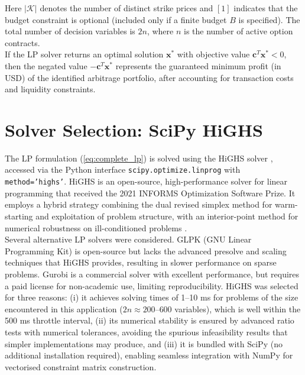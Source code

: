 \documentclass[openany]{book}
\numberwithin{figure}{chapter}
\numberwithin{equation}{chapter}
\begin{document}
Here $|\mathcal{K}|$ denotes the number of distinct strike prices and $[1]$ indicates that the budget constraint is optional (included only if a finite budget $B$ is specified). The total number of decision variables is $2n$, where $n$ is the number of active option contracts.\\

If the LP solver returns an optimal solution $\mathbf{x}^*$ with objective value $\mathbf{c}^T\mathbf{x}^* < 0$, then the negated value $-\mathbf{c}^T\mathbf{x}^*$ represents the guaranteed minimum profit (in USD) of the identified arbitrage portfolio, after accounting for transaction costs and liquidity constraints.

\section{Solver Selection: SciPy HiGHS}

The LP formulation (\ref{eq:complete_lp}) is solved using the HiGHS solver \cite{huangfu2018}, accessed via the Python interface \texttt{scipy.optimize.linprog} with \texttt{method='highs'}. HiGHS is an open-source, high-performance solver for linear programming that received the 2021 INFORMS Optimization Software Prize. It employs a hybrid strategy combining the dual revised simplex method for warm-starting and exploitation of problem structure, with an interior-point method for numerical robustness on ill-conditioned problems \cite{huangfu2018}.\\

Several alternative LP solvers were considered. GLPK (GNU Linear Programming Kit) is open-source but lacks the advanced presolve and scaling techniques that HiGHS provides, resulting in slower performance on sparse problems. Gurobi is a commercial solver with excellent performance, but requires a paid license for non-academic use, limiting reproducibility. HiGHS was selected for three reasons: (i) it achieves solving times of 1--10 ms for problems of the size encountered in this application ($2n \approx 200$--$600$ variables), which is well within the 500 ms throttle interval, (ii) its numerical stability is ensured by advanced ratio tests with numerical tolerances, avoiding the spurious infeasibility results that simpler implementations may produce, and (iii) it is bundled with SciPy (no additional installation required), enabling seamless integration with NumPy for vectorised constraint matrix construction.\\
\end{document}
